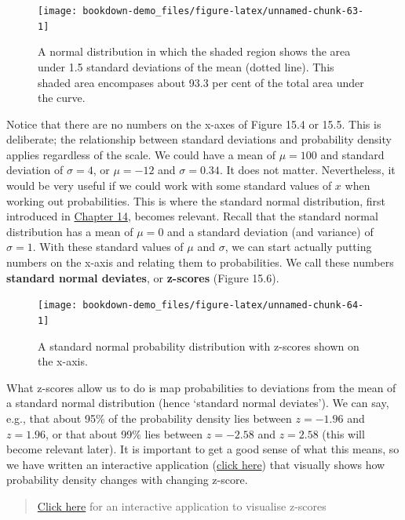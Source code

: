 \documentclass[
]{scrbook}
\begin{document}
\begin{figure}
\texttt{[image: bookdown-demo\_files/figure-latex/unnamed-chunk-63-1]} \caption{A normal distribution in which the shaded region shows the area under 1.5 standard deviations of the mean (dotted line). This shaded area encompases about 93.3 per cent of the total area under the curve.}\label{fig:unnamed-chunk-63}
\end{figure}

Notice that there are no numbers on the x-axes of Figure 15.4 or 15.5.
This is deliberate; the relationship between standard deviations and probability density applies regardless of the scale.
We could have a mean of \(\mu = 100\) and standard deviation of \(\sigma = 4\), or \(\mu = -12\) and \(\sigma = 0.34\).
It does not matter.
Nevertheless, it would be very useful if we could work with some standard values of \(x\) when working out probabilities.
This is where the standard normal distribution, first introduced in \protect\hyperlink{Chapter_14}{Chapter 14}, becomes relevant.
Recall that the standard normal distribution has a mean of \(\mu = 0\) and a standard deviation (and variance) of \(\sigma = 1\).
With these standard values of \(\mu\) and \(\sigma\), we can start actually putting numbers on the x-axis and relating them to probabilities.
We call these numbers \textbf{standard normal deviates}, or \textbf{z-scores} (Figure 15.6).

\begin{figure}
\texttt{[image: bookdown-demo\_files/figure-latex/unnamed-chunk-64-1]} \caption{A standard normal probability distribution with z-scores shown on the x-axis.}\label{fig:unnamed-chunk-64}
\end{figure}

What z-scores allow us to do is map probabilities to deviations from the mean of a standard normal distribution (hence `standard normal deviates').
We can say, e.g., that about 95\% of the probability density lies between \(z = -1.96\) and \(z = 1.96\), or that about 99\% lies between \(z = -2.58\) and \(z = 2.58\) (this will become relevant later).
It is important to get a good sense of what this means, so we have written an interactive application (\href{https://bradduthie.shinyapps.io/zandp/}{click here}) that visually shows how probability density changes with changing z-score.

\begin{quote}
\href{https://bradduthie.shinyapps.io/zandp/}{Click here} for an interactive application to visualise z-scores
\end{quote}
\end{document}
